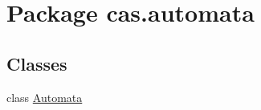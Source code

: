 \hypertarget{namespacecas_1_1automata}{\section{Package cas.\-automata}
\label{namespacecas_1_1automata}
}
\subsection*{Classes}
\begin{DoxyCompactItemize}
\item 
class \hyperlink{classcas_1_1automata_1_1_automata}{Automata}
\end{DoxyCompactItemize}
